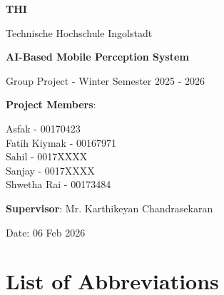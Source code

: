 \documentclass[12pt,a4paper]{report}
\begin{document}
\hypersetup{pageanchor=false}

\begin{titlepage}
\centering
\vspace*{1cm}

\textbf{\huge THI}\\[1cm]

{\Large Technische Hochschule Ingolstadt\par}
\vspace{1cm}
{\huge\bfseries AI-Based Mobile Perception System\par}
\vspace{0.5cm}
{Group Project - Winter Semester 2025 - 2026}
\vspace{0.5cm}

\vfill

{\large \textbf{Project Members}: \par}
\vspace{0.3cm}
{\large
Asfak - 00170423 \\
Fatih Kiymak - 00167971 \\
Sahil - 0017XXXX \\
Sanjay - 0017XXXX \\
Shwetha Rai - 00173484 \par}
\vspace{0.5cm}

{\large \textbf{Supervisor}: Mr. Karthikeyan Chandrasekaran\par}
\vspace{0.2cm}

{\large Date: 06 Feb 2026\par}

\end{titlepage}

\clearpage
{}
\hypersetup{pageanchor=true}

\tableofcontents
\clearpage
{}
\listoffigures
\clearpage
{}
\listoftables
\clearpage

\chapter*{List of Abbreviations}
\end{document}
